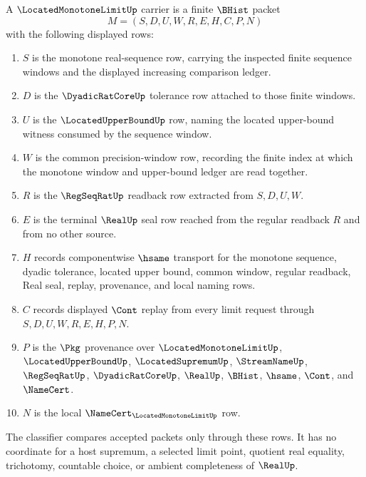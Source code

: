 \begin{definition}
\label{def:located-monotone-limit-carrier}
A $\LocatedMonotoneLimitUp$ carrier is a finite $\BHist$ packet
$$
M=(S,D,U,W,R,E,H,C,P,N)
$$
with the following displayed rows:
\begin{enumerate}
\item $S$ is the monotone real-sequence row, carrying the inspected finite sequence windows and the displayed increasing comparison ledger.
\item $D$ is the $\DyadicRatCoreUp$ tolerance row attached to those finite windows.
\item $U$ is the $\LocatedUpperBoundUp$ row, naming the located upper-bound witness consumed by the sequence window.
\item $W$ is the common precision-window row, recording the finite index at which the monotone window and upper-bound ledger are read together.
\item $R$ is the $\RegSeqRatUp$ readback row extracted from $S,D,U,W$.
\item $E$ is the terminal $\RealUp$ seal row reached from the regular readback $R$ and from no other source.
\item $H$ records componentwise $\hsame$ transport for the monotone sequence, dyadic tolerance, located upper bound, common window, regular readback, Real seal, replay, provenance, and local naming rows.
\item $C$ records displayed $\Cont$ replay from every limit request through $S,D,U,W,R,E,H,P,N$.
\item $P$ is the $\Pkg$ provenance over $\LocatedMonotoneLimitUp$, $\LocatedUpperBoundUp$, $\LocatedSupremumUp$, $\StreamNameUp$, $\RegSeqRatUp$, $\DyadicRatCoreUp$, $\RealUp$, $\BHist$, $\hsame$, $\Cont$, and $\NameCert$.
\item $N$ is the local $\NameCert_{\LocatedMonotoneLimitUp}$ row.
\end{enumerate}
The classifier compares accepted packets only through these rows. It has no coordinate for a host supremum, a selected limit point, quotient real equality, trichotomy, countable choice, or ambient completeness of $\RealUp$.
\end{definition}

